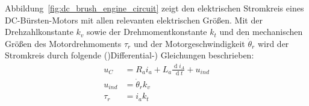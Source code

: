 \documentclass[a4paper, 11pt, accentcolor = tud3b]{tudreport}
\DeclareMathOperator{\total}{d}
\begin{document}
			Abbildung~\ref{fig:dc_brush_engine_circuit} zeigt den elektrischen Stromkreis eines DC-Bürsten-Motors mit allen relevanten elektrischen Größen. Mit der Drehzahlkonstante \(k_v\) sowie der Drehmomentkonstante \(k_t\) und den mechanischen Größen des Motordrehmoments \(\tau_r\) und der Motorgeschwindigkeit \(\dot{\theta}_r\) wird der Stromkreis durch folgende ()Differential-) Gleichungen beschrieben:
			\begin{align*}
				u_C            & = R_a i_a + L_a \frac{\total i_A}{\total t} + u_\mathit{ind} \tag{Ankerstromkreis}     \\
				u_\mathit{ind} & = \dot{\theta}_r k_v                                         \tag{Induzierte Spannung} \\
				\tau_r         & = i_a k_t                                                    \tag{Motordrehmoment}
			\end{align*}
			
\end{document}
